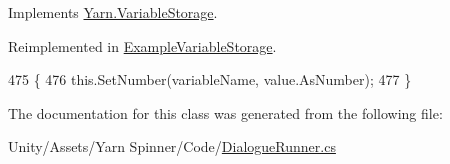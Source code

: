 Implements \hyperlink{a00166_aa90ff61224432c5ed3ce72199c55f440}{Yarn.\-Variable\-Storage}.



Reimplemented in \hyperlink{a00069_ac4265c1c9da485f13a6b05784b0f668d}{Example\-Variable\-Storage}.


\begin{DoxyCode}
475                                                                        \{
476             this.SetNumber(variableName, value.AsNumber);
477         \}
\end{DoxyCode}


The documentation for this class was generated from the following file\-:\begin{DoxyCompactItemize}
\item 
Unity/\-Assets/\-Yarn Spinner/\-Code/\hyperlink{a00253}{Dialogue\-Runner.\-cs}\end{DoxyCompactItemize}
